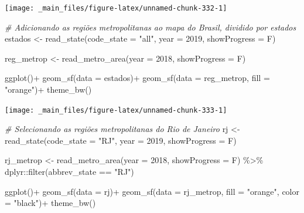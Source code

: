 \documentclass[
  brazilian,
]{book}
\newenvironment{Shaded}{\begin{snugshade}}{\end{snugshade}}
\newcommand{\AttributeTok}[1]{\textcolor[rgb]{0.77,0.63,0.00}{#1}}
\newcommand{\CommentTok}[1]{\textcolor[rgb]{0.56,0.35,0.01}{\textit{#1}}}
\newcommand{\DecValTok}[1]{\textcolor[rgb]{0.00,0.00,0.81}{#1}}
\newcommand{\FunctionTok}[1]{\textcolor[rgb]{0.00,0.00,0.00}{#1}}
\newcommand{\NormalTok}[1]{#1}
\newcommand{\OtherTok}[1]{\textcolor[rgb]{0.56,0.35,0.01}{#1}}
\newcommand{\SpecialCharTok}[1]{\textcolor[rgb]{0.00,0.00,0.00}{#1}}
\newcommand{\StringTok}[1]{\textcolor[rgb]{0.31,0.60,0.02}{#1}}
\begin{document}
\begin{center}\texttt{[image: \_main\_files/figure-latex/unnamed-chunk-332-1]} \end{center}

\begin{Shaded}
\begin{Highlighting}[]
\CommentTok{\# Adicionando as regiões metropolitanas ao mapa do Brasil, dividido por estados}
\NormalTok{estados }\OtherTok{\textless{}{-}} \FunctionTok{read\_state}\NormalTok{(}\AttributeTok{code\_state =} \StringTok{"all"}\NormalTok{,}
                      \AttributeTok{year =} \DecValTok{2019}\NormalTok{,}
                      \AttributeTok{showProgress =}\NormalTok{ F)}

\NormalTok{reg\_metrop }\OtherTok{\textless{}{-}} \FunctionTok{read\_metro\_area}\NormalTok{(}\AttributeTok{year =} \DecValTok{2018}\NormalTok{,}
                              \AttributeTok{showProgress =}\NormalTok{ F)}

\FunctionTok{ggplot}\NormalTok{()}\SpecialCharTok{+}
  \FunctionTok{geom\_sf}\NormalTok{(}\AttributeTok{data =}\NormalTok{ estados)}\SpecialCharTok{+}
  \FunctionTok{geom\_sf}\NormalTok{(}\AttributeTok{data =}\NormalTok{ reg\_metrop, }\AttributeTok{fill =} \StringTok{"orange"}\NormalTok{)}\SpecialCharTok{+}
  \FunctionTok{theme\_bw}\NormalTok{()}
\end{Highlighting}
\end{Shaded}

\begin{center}\texttt{[image: \_main\_files/figure-latex/unnamed-chunk-333-1]} \end{center}

\begin{Shaded}
\begin{Highlighting}[]
\CommentTok{\# Selecionando as regiões metropolitanas do Rio de Janeiro}
\NormalTok{rj }\OtherTok{\textless{}{-}} \FunctionTok{read\_state}\NormalTok{(}\AttributeTok{code\_state =} \StringTok{"RJ"}\NormalTok{,}
                 \AttributeTok{year =} \DecValTok{2019}\NormalTok{,}
                 \AttributeTok{showProgress =}\NormalTok{ F)}

\NormalTok{rj\_metrop }\OtherTok{\textless{}{-}} \FunctionTok{read\_metro\_area}\NormalTok{(}\AttributeTok{year =} \DecValTok{2018}\NormalTok{,}
                             \AttributeTok{showProgress =}\NormalTok{ F) }\SpecialCharTok{\%\textgreater{}\%} 
\NormalTok{  dplyr}\SpecialCharTok{::}\FunctionTok{filter}\NormalTok{(abbrev\_state }\SpecialCharTok{==} \StringTok{"RJ"}\NormalTok{)}

\FunctionTok{ggplot}\NormalTok{()}\SpecialCharTok{+}
  \FunctionTok{geom\_sf}\NormalTok{(}\AttributeTok{data =}\NormalTok{ rj)}\SpecialCharTok{+}
  \FunctionTok{geom\_sf}\NormalTok{(}\AttributeTok{data =}\NormalTok{ rj\_metrop, }\AttributeTok{fill =} \StringTok{"orange"}\NormalTok{, }\AttributeTok{color =} \StringTok{"black"}\NormalTok{)}\SpecialCharTok{+}
  \FunctionTok{theme\_bw}\NormalTok{()}
\end{Highlighting}
\end{Shaded}
\end{document}
